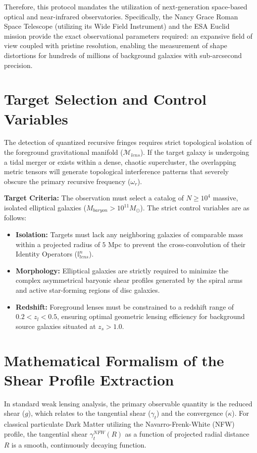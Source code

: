 \documentclass[12pt,openany]{book}
\begin{document}
Therefore, this protocol mandates the utilization of next-generation space-based optical and near-infrared observatories. Specifically, the Nancy Grace Roman Space Telescope (utilizing its Wide Field Instrument) and the ESA Euclid mission provide the exact observational parameters required: an expansive field of view coupled with pristine resolution, enabling the measurement of shape distortions for hundreds of millions of background galaxies with sub-arcsecond precision.

\section{Target Selection and Control Variables}
The detection of quantized recursive fringes requires strict topological isolation of the foreground gravitational manifold ($\mathcal{M}_{lens}$). If the target galaxy is undergoing a tidal merger or exists within a dense, chaotic supercluster, the overlapping metric tensors will generate topological interference patterns that severely obscure the primary recursive frequency ($\omega_r$).

\textbf{Target Criteria:} The observation must select a catalog of $N \ge 10^4$ massive, isolated elliptical galaxies ($M_{baryon} > 10^{11} M_\odot$). The strict control variables are as follows:

\begin{itemize}
    \item \textbf{Isolation:} Targets must lack any neighboring galaxies of comparable mass within a projected radius of $5$ Mpc to prevent the cross-convolution of their Identity Operators ($\mathbb{I}_{lens}^n$).
    \item \textbf{Morphology:} Elliptical galaxies are strictly required to minimize the complex asymmetrical baryonic shear profiles generated by the spiral arms and active star-forming regions of disc galaxies.
    \item \textbf{Redshift:} Foreground lenses must be constrained to a redshift range of $0.2 < z_l < 0.5$, ensuring optimal geometric lensing efficiency for background source galaxies situated at $z_s > 1.0$.
\end{itemize}

\section{Mathematical Formalism of the Shear Profile Extraction}
In standard weak lensing analysis, the primary observable quantity is the reduced shear ($g$), which relates to the tangential shear ($\gamma_t$) and the convergence ($\kappa$). For classical particulate Dark Matter utilizing the Navarro-Frenk-White (NFW) profile, the tangential shear $\gamma_t^{NFW}(R)$ as a function of projected radial distance $R$ is a smooth, continuously decaying function.
\end{document}
